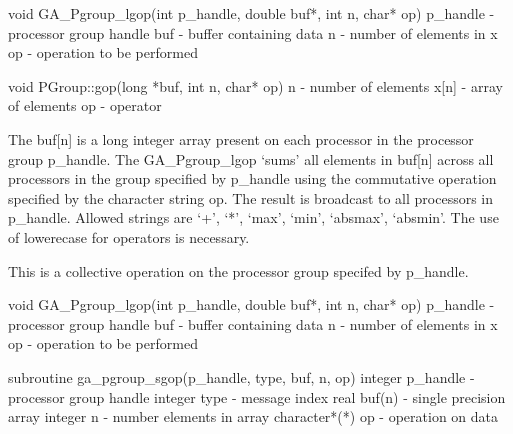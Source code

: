 \documentclass[12pt]{article}
\begin{document}

\begin{capi}
void GA_Pgroup_lgop(int p_handle, double buf*, int n, char* op)
   p_handle                      - processor group handle                  \access{[input]} 
   buf                           - buffer containing data                   
   n                             - number of elements in x                 \access{[input]} 
   op                            - operation to be performed               \access{[input]} 
\end{capi}

\begin{cxxapi}
void PGroup::gop(long *buf, int n, char* op)
   n              - number of elements                                     \access{[input]}
   x[n]           - array of elements                                      
   op             - operator                                               \access{[input]}
\end{cxxapi}

\begin{desc}

The buf[n] is a long integer array present on each processor in the processor group p_handle. The GA_Pgroup_lgop `sums' all elements in buf[n] across all processors in the group specified by p_handle using the commutative operation specified by the character string op.  The result is broadcast to all processors in p_handle. Allowed strings are `+', `*', `max', `min', `absmax', `absmin'. The use of lowerecase for operators is necessary.

This is a collective operation on the processor group specifed by p_handle. 
\end{desc}


\begin{capi}
void GA_Pgroup_lgop(int p_handle, double buf*, int n, char* op)
   p_handle                      - processor group handle                  \access{[input]} 
   buf                           - buffer containing data                   
   n                             - number of elements in x                 \access{[input]} 
   op                            - operation to be performed               \access{[input]} 
\end{capi}

\begin{fapi}
subroutine ga_pgroup_sgop(p_handle, type, buf, n, op)
   integer p_handle              - processor group handle                  \access{[input]} 
   integer type                  - message index                           \access{[input]} 
   real buf(n)                   - single precision array                   
   integer n                     - number elements in array                \access{[input]} 
   character*(*) op              - operation on data                       \access{[input]} 
\end{fapi}
\end{document}

